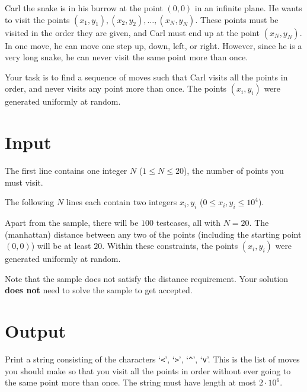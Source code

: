 

Carl the snake is in his burrow at the point $(0,0)$ in an infinite plane. He wants to visit 
the points $(x_1, y_1), (x_2, y_2), \dots, (x_N, y_N)$. These points must be visited in the order they are given,
and Carl must end up at the point $(x_N, y_N)$. In one move, he can move one step up, down, left, or right.
However, since he is a very long snake, he can never visit the same point more than once.

Your task is to find a sequence of moves such that Carl visits all the points in order, and 
never visits any point more than once. The points $(x_i, y_i)$ were generated uniformly at random.

\section*{Input}
The first line contains one integer $N$ ($1 \leq N \leq 20$), the number of points you must visit.

The following $N$ lines each contain two integers $x_i, y_i$ ($0 \leq x_i, y_i \leq 10^4$).

Apart from the sample, there will be $100$ testcases, all with $N = 20$. The 
(manhattan) distance between any two of the points (including the starting 
point $(0,0)$) will be at least $20$. Within these constraints, the points 
$(x_i, y_i)$ were generated uniformly at random.

Note that the sample does not satisfy the distance requirement. Your solution \textbf{does not} need to solve the sample to get accepted. 

\section*{Output}
Print a string consisting of the characters `\verb!<!', `\verb!>!', `\verb!^!', `\verb!v!'.
This is the list of moves you should make so that you visit all the points in order without 
ever going to the same point more than once. The string must have length at most $2 \cdot 10^6$.
